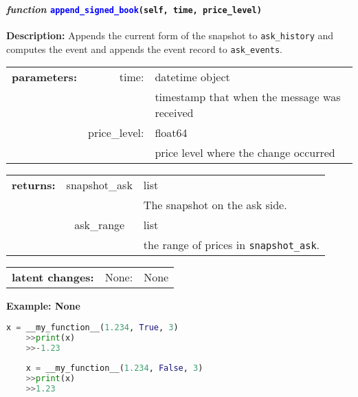 \paragraph{\textit{function} \textcolor{blue}{\texttt{append\_signed\_book}}\texttt{(self, time, price\_level)}}\hfill\break
\noindent \textbf{Description:} Appends the current form of the snapshot to \texttt{ask\_history} and computes the event and appends the event record to \texttt{ask\_events}. 

\begin{tabular}{r r l }
	\textbf{parameters:}	& time: & datetime object\\
	&  & timestamp that when the message was received\\
	& price\_level:& float64\\
	&& price level where the change occurred\\
\end{tabular}

\begin{tabular}{l c l}
	\textbf{returns:} & snapshot\_ask & list\\
	& & The snapshot on the ask side.\\
	& ask\_range & list\\
	&& the range of prices in \texttt{snapshot\_ask}.
\end{tabular}

\begin{tabular}{l c l}
	\textbf{latent changes:} & None: & None\\
\end{tabular}

\textbf{Example: None}
\begin{lstlisting}[language=Python]
	x = __my_function__(1.234, True, 3)
	>>print(x)
	>>-1.23
	
	x = __my_function__(1.234, False, 3)
	>>print(x)
	>>1.23
\end{lstlisting}